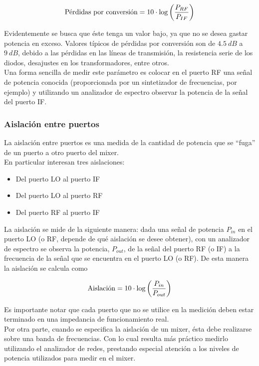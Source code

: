 \documentclass[a4paper,10pt]{article}
\begin{document}
	$$\textmd{P\'erdidas por conversi\'on}=10\cdot\log\left(
	\frac{P_{RF}}{P_{IF}}\right)$$
		
	\indent Evidentemente se busca que \'este tenga un valor bajo, ya que no se 
	desea gastar potencia en exceso. Valores t\'ipicos de p\'erdidas por 
	conversi\'on son de $4.5~dB$ a $9~dB$, debido a las p\'erdidas en las 
	l\'ineas de transmisi\'on, la resistencia serie de los diodos, desajustes en
	los transformadores, entre otros. \\
	\indent Una forma sencilla de medir este par\'ametro es colocar en el puerto
	RF una señal de potencia conocida (proporcionada por un sintetizador de 
	frecuencias, por ejemplo) y utilizando un analizador de espectro observar la
	potencia de la señal del puerto IF.
		
	\subsubsection{Aislación entre puertos}
	\indent La aislación entre puertos es una medida de la cantidad de potencia 
	que se ``fuga'' de un puerto a otro puerto del mixer. \\
	\indent En particular interesan tres aislaciones:

	\begin{itemize}
		\item Del puerto LO al puerto IF
		\item Del puerto LO al puerto RF
		\item Del puerto RF al puerto IF
	\end{itemize}
	
	\indent La aislaci\'on se mide de la siguiente manera: dada una se\~nal de 
	potencia $P_{in}$ en el puerto LO (o RF, depende de qu\'e aislaci\'on se 
	desee obtener), con un analizador de espectro se observa la potencia, 
	$P_{out}$, de la señal del puerto RF (o IF) a la frecuencia de la señal que 
	se encuentra en el puerto LO (o RF). De esta manera la aislaci\'on se 
	calcula como		
	
	$$\textmd{Aislaci\'on}=10\cdot\log\left(\frac{P_{in}}{P_{out}}\right)$$
		
	\indent Es importante notar que cada puerto que no se utilice en la 
	medici\'on deben estar terminado en una impedancia de funcionamiento real.\\
	\indent	Por otra parte, cuando se especifica la aislaci\'on de un mixer, 
	\'esta debe realizarse sobre una banda de frecuencias. Con lo cual resulta 
	m\'as pr\'actico medirlo utilizando el analizador de redes, prestando 
	especial atenci\'on a los niveles de potencia utilizados para medir en el 
	mixer.
	
\end{document}
